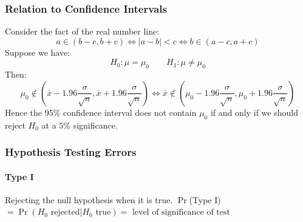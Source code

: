 \documentclass[a4paper,twoside,10pt]{article}
\begin{document}
			\subsubsection{Relation to Confidence Intervals}
				Consider the fact of the real number line:
				\[
					a\in\left(b-c,b+c\right)\iff|a-b|<c\iff b\in(a-c,a+c)
				\]
				Suppose we have:
				\[
					H_0:\mu=\mu_0 \qquad H_1:\mu\neq\mu_0
				\]
				Then:
				\[
					\mu_0\notin\left(\bar{x}-1.96\frac{\sigma}{\sqrt{n}},\bar{x}+1.96\frac{\sigma}{\sqrt{n}}\right)\iff\bar{x}\notin\left(\mu_0-1.96\frac{\sigma}{\sqrt{n}},\mu_0+1.96\frac{\sigma}{\sqrt{n}}\right)
				\]
				Hence the 95\% confidence interval does not contain $\mu_0$ if and only if we should reject $H_0$ at a $5\%$ significance.
			\subsubsection{Hypothesis Testing Errors}
				\paragraph{Type I} Rejecting the null hypothesis when it is true. $\Pr$(Type I)$=\Pr(H_0 \text{ rejected}|H_0 \text{ true})=\text{ level of significance of test}$
\end{document}
